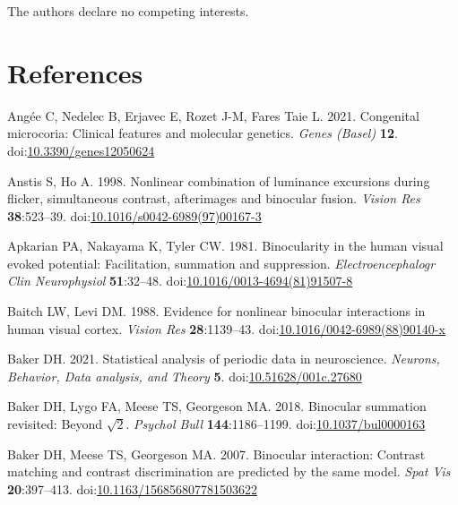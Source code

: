\documentclass[
]{article}
\newlength{\cslhangindent}
\newlength{\cslentryspacingunit} %
\newenvironment{CSLReferences}[2] %
 {%
  \setlength{\parindent}{0pt}
  \ifodd #1
  \let\oldpar\par
  \def\par{\hangindent=\cslhangindent\oldpar}
  \fi
  \setlength{\parskip}{#2\cslentryspacingunit}
 }%
 {}
\begin{document}
The authors declare no competing interests.

\hypertarget{references}{%
\section{References}\label{references}}

\hypertarget{refs}{}
\begin{CSLReferences}{1}{0}
\leavevmode{}%
Angée C, Nedelec B, Erjavec E, Rozet J-M, Fares Taie L. 2021. Congenital microcoria: Clinical features and molecular genetics. \emph{Genes (Basel)} \textbf{12}. doi:\href{https://doi.org/10.3390/genes12050624}{10.3390/genes12050624}

\leavevmode{}%
Anstis S, Ho A. 1998. Nonlinear combination of luminance excursions during flicker, simultaneous contrast, afterimages and binocular fusion. \emph{Vision Res} \textbf{38}:523--39. doi:\href{https://doi.org/10.1016/s0042-6989(97)00167-3}{10.1016/s0042-6989(97)00167-3}

\leavevmode{}%
Apkarian PA, Nakayama K, Tyler CW. 1981. Binocularity in the human visual evoked potential: Facilitation, summation and suppression. \emph{Electroencephalogr Clin Neurophysiol} \textbf{51}:32--48. doi:\href{https://doi.org/10.1016/0013-4694(81)91507-8}{10.1016/0013-4694(81)91507-8}

\leavevmode{}%
Baitch LW, Levi DM. 1988. Evidence for nonlinear binocular interactions in human visual cortex. \emph{Vision Res} \textbf{28}:1139--43. doi:\href{https://doi.org/10.1016/0042-6989(88)90140-x}{10.1016/0042-6989(88)90140-x}

\leavevmode{}%
Baker DH. 2021. Statistical analysis of periodic data in neuroscience. \emph{Neurons, Behavior, Data analysis, and Theory} \textbf{5}. doi:\href{https://doi.org/10.51628/001c.27680}{10.51628/001c.27680}

\leavevmode{}%
Baker DH, Lygo FA, Meese TS, Georgeson MA. 2018. Binocular summation revisited: Beyond \(\sqrt{2}\). \emph{Psychol Bull} \textbf{144}:1186--1199. doi:\href{https://doi.org/10.1037/bul0000163}{10.1037/bul0000163}

\leavevmode{}%
Baker DH, Meese TS, Georgeson MA. 2007. Binocular interaction: Contrast matching and contrast discrimination are predicted by the same model. \emph{Spat Vis} \textbf{20}:397--413. doi:\href{https://doi.org/10.1163/156856807781503622}{10.1163/156856807781503622}


\end{CSLReferences}
\end{document}
